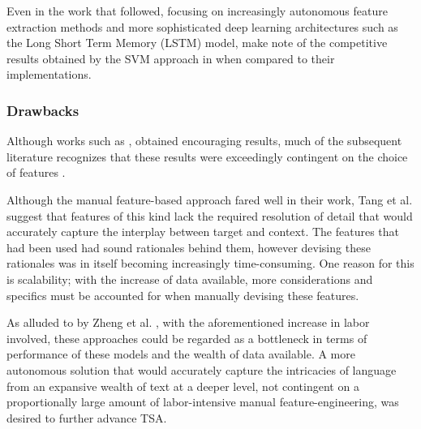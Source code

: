 \documentclass[../../fyp.tex]{subfiles}
\begin{document}
Even in the work that followed, focusing on increasingly autonomous feature extraction methods and more sophisticated deep learning architectures such as the Long Short Term Memory (LSTM) model, \cite{tang2016b} make note of the competitive results obtained by the SVM approach in \cite{kiritchenko} when compared to their implementations.

\subsubsection{Drawbacks}
Although works such as \cite{kiritchenko}, \cite{wagner2014} obtained encouraging results, much of the subsequent literature recognizes that these results were exceedingly contingent on the choice of features \cite{tang2016b}.

Although the manual feature-based approach fared well in their work, Tang et al. \cite{tang2016b} suggest that features of this kind lack the required resolution of detail that would accurately capture the interplay between target and context. The features that had been used had sound rationales behind them, however devising these rationales was in itself becoming increasingly time-consuming. One reason for this is scalability; with the increase of data available, more considerations and specifics must be accounted for when manually devising these features.

As alluded to by Zheng et al. \cite{zheng2018}, with the aforementioned increase in labor involved, these approaches could be regarded as a bottleneck in terms of performance of these models and the wealth of data available. A more autonomous solution that would accurately capture the intricacies of language from an expansive wealth of text at a deeper level, not contingent on a proportionally large amount of labor-intensive manual feature-engineering, was desired to further advance TSA.
\end{document}
